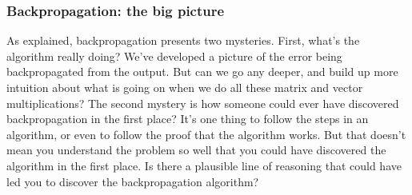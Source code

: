 \documentclass[12pt, letterpaper]{article}
\theoremstyle{definition}
\begin{document}
\subsubsection{Backpropagation: the big picture}
As explained, backpropagation presents two mysteries. First, what's the algorithm really doing? We've developed a picture of the error being backpropagated from the output. But can we go any deeper, and build up more intuition about what is going on when we do all these matrix and vector multiplications? The second mystery is how someone could ever have discovered backpropagation in the first place? It's one thing to follow the steps in an algorithm, or even to follow the proof that the algorithm works. But that doesn't mean you understand the problem so well that you could have discovered the algorithm in the first place. Is there a plausible line of reasoning that could have led you to discover the backpropagation algorithm?
\end{document}
